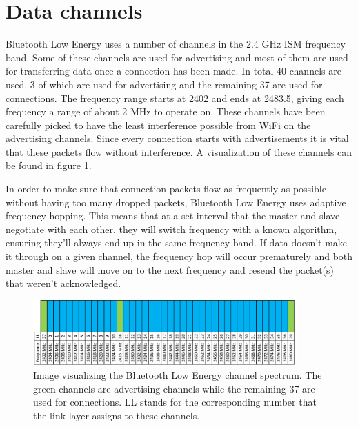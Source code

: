 \documentclass[pdftex,a4paper,12pt,twoside]{report}
\begin{document}
\section{Data channels}
\label{sec:channels}
Bluetooth Low Energy uses a number of channels in the 2.4 GHz ISM frequency band. Some of these channels are used for advertising and most of them are used for transferring data once a connection has been made. In total 40 channels are used, 3 of which are used for advertising and the remaining 37 are used for connections. The frequency range starts at 2402 and ends at 2483.5, giving each frequency a range of about 2 MHz to operate on. These channels have been carefully picked to have the least interference possible from WiFi on the advertising channels. Since every connection starts with advertisements it is vital that these packets flow without interference. A visualization of these channels can be found in figure \ref{fig:channelmap}.

In order to make sure that connection packets flow as frequently as possible without having too many dropped packets, Bluetooth Low Energy uses adaptive frequency hopping. This means that at a set interval that the master and slave negotiate with each other, they will switch frequency with a known algorithm, ensuring they'll always end up in the same frequency band. If data doesn't make it through on a given channel, the frequency hop will occur prematurely and both master and slave will move on to the next frequency and resend the packet(s) that weren't acknowledged.

\begin{figure}[h]
    \centering
    \includegraphics[width=0.9\textwidth]{img/channelmap.png}
    \caption[Image visualizing the Bluetooth Low Energy channel spectrum]{Image visualizing the Bluetooth Low Energy channel spectrum. The green channels are advertising channels while the remaining 37 are used for connections. LL stands for the corresponding number that the link layer assigns to these channels.}
    \label{fig:channelmap}
\end{figure}
\end{document}
